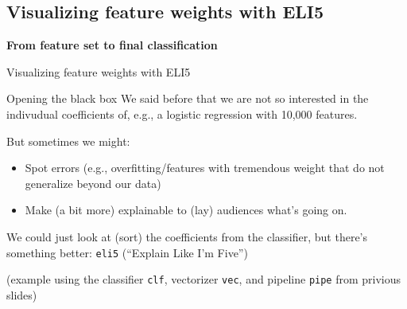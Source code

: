 \documentclass{beamer}
\begin{document}
\subsection{Visualizing feature weights with ELI5}

\begin{frame}[plain]
\textbf{From feature set to final classification}

Visualizing feature weights with ELI5
\end{frame}



\begin{frame}{Opening the black box}
We said before that we are not so interested in the indivudual coefficients of, e.g., a logistic regression with 10,000 features.

\pause 

But sometimes we might:
\begin{itemize}[<+->]
	\item Spot errors (e.g., overfitting/features with tremendous weight that do not generalize beyond our data) 
	\item Make (a bit more) explainable to (lay) audiences what's going on.
\end{itemize}

\pause

We could just look at (sort) the coefficients from the classifier, but there's something better: \texttt{eli5} (``Explain Like I'm Five'')
\end{frame}




\begin{frame}[plain]
(example using the classifier \texttt{clf}, vectorizer \texttt{vec}, and pipeline \texttt{pipe} from privious slides)
\end{frame}
\end{document}
